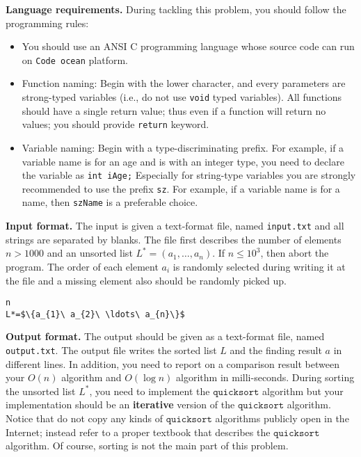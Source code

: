 \documentclass{article}
\begin{document}
\bigskip
\noindent\textbf{Language requirements. }%
During tackling this problem, you should follow the programming rules:
\begin{itemize}
\item You should use an ANSI C programming language whose source code can run on \texttt{Code ocean} platform. 
\item Function naming: Begin with the lower character, and every parameters are strong-typed variables (i.e., do not use \texttt{void} typed variables).
	All functions should have a single return value; thus even if a function will return no values; you should provide \texttt{return} keyword.
\item Variable naming: Begin with a type-discriminating prefix. For example, if a variable name is for an age and is with an integer type,
	you need to declare the variable as \texttt{int iAge;}  Especially for string-type variables you are strongly recommended to use the prefix \texttt{sz}.
	For example, if a variable name is for a name, then \texttt{szName} is a preferable choice.
\end{itemize}


\bigskip
\noindent\textbf{Input format.} %
The input is given a text-format file, named \texttt{input.txt} and all strings are separated by blanks.
The file first describes the number of elements $n>1000$ and an unsorted list $L^\ast=(a_1,\ldots,a_n)$.
If $n\leq 10^3$, then abort the program. The order of each element $a_i$ is randomly selected during writing 
it at the file and a missing element also should be randomly picked up.



\begin{lstlisting}[backgroundcolor=\color{yellow!40}]
n
L*=$\{a_{1}\ a_{2}\ \ldots\ a_{n}\}$
\end{lstlisting}



\bigskip
\noindent\textbf{Output format.} %
The output should be given as a text-format file, named \texttt{output.txt}.
The output file writes the sorted list $L$ and the finding result $a$ in different lines.
In addition, you need to report on a comparison result between your $O(n)$ algorithm and $O(\log n)$ algorithm
in milli-seconds. 
During sorting the unsorted list $L^\ast$, you need to implement the $\mathtt{quicksort}$ algorithm but 
your implementation should be an \textbf{iterative} version of the $\mathtt{quicksort}$ algorithm.
Notice that do not copy any kinds of $\mathtt{quicksort}$ algorithms publicly open in the Internet; 
instead refer to a proper textbook that describes the $\mathtt{quicksort}$ algorithm.
Of course, sorting is not the main part of this problem.
\end{document}
